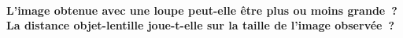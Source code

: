 \documentclass[../../main/main.tex]{subfiles}
\begin{document}
\begin{tcb}[label=def:loupe, valign=center]
\begin{isd}
\begin{center}
			\label{loupesansacc}
		\end{center}
	\end{isd}
\end{tcb}

\paragraph*{L'image obtenue avec une loupe peut-elle être plus ou moins grande~?
	La distance objet-lentille joue-t-elle sur la taille de l'image
	observée~?\newline\newline}
\end{document}
